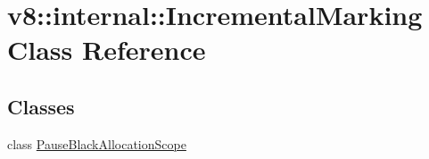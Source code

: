 \hypertarget{classv8_1_1internal_1_1IncrementalMarking}{}\section{v8\+:\+:internal\+:\+:Incremental\+Marking Class Reference}
\label{classv8_1_1internal_1_1IncrementalMarking}
\subsection*{Classes}
\begin{DoxyCompactItemize}
\item 
class \mbox{\hyperlink{classv8_1_1internal_1_1IncrementalMarking_1_1PauseBlackAllocationScope}{Pause\+Black\+Allocation\+Scope}}
\end{DoxyCompactItemize}
